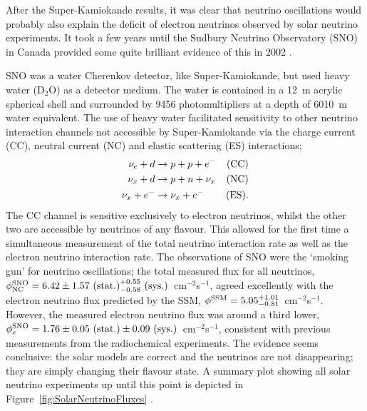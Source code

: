 After the Super-Kamiokande results, it was clear that neutrino oscillations would probably also explain the deficit of electron neutrinos observed by solar neutrino experiments.  It took a few years until the Sudbury Neutrino Observatory (SNO) in Canada provided some quite brilliant evidence of this in 2002 \cite{SNO2002}.

SNO was a water Cherenkov detector, like Super-Kamiokande, but used heavy water (D$_2$O) as a detector medium.  The water is contained in a 12~m acrylic spherical shell and surrounded by 9456 photomultipliers at a depth of 6010~m water equivalent.  The use of heavy water facilitated sensitivity to other neutrino interaction channels not accessible by Super-Kamiokande via the charge current (CC), neutral current (NC) and elastic scattering (ES) interactions;
\begin{align}
  \nu_e + d &\rightarrow p + p + e^- &\textnormal{(CC)} \\
  \nu_x + d &\rightarrow p + n + \nu_x &\textnormal{(NC)} \\
  \nu_x + e^- &\rightarrow \nu_x + e^- &\textnormal{(ES)}.
\end{align}
The CC channel is sensitive exclusively to electron neutrinos, whilst the other two are accessible by neutrinos of any flavour.  This allowed for the first time a simultaneous measurement of the total neutrino interaction rate as well as the electron neutrino interaction rate.  The observations of SNO were the `smoking gun' for neutrino oscillations; the total measured flux for all neutrinos, $\phi_{\textnormal{NC}}^{\textnormal{SNO}} = 6.42\pm1.57\textnormal{~(stat.)}^{+0.55}_{-0.58}\textnormal{~(sys.)}$~cm$^{-2}$s$^{-1}$, agreed excellently with the electron neutrino flux predicted by the SSM, $\phi^{\textnormal{SSM}} = 5.05^{+1.01}_{-0.81}$~cm$^{-2}$s$^{-1}$.  However, the measured electron neutrino flux was around a third lower, $\phi_e^{\textnormal{SNO}} = 1.76\pm0.05\textnormal{~(stat.)}\pm0.09\textnormal{~(sys.)}$~cm$^{-2}$s$^{-1}$, consistent with previous measurements from the radiochemical experiments.  The evidence seems conclusive: the solar models are correct and the neutrinos are not disappearing; they are simply changing their flavour state.  A summary plot showing all solar neutrino experiments up until this point is depicted in Figure~\ref{fig:SolarNeutrinoFluxes} \cite{Bahcall2005Fluxes}.

